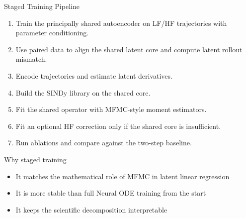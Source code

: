 \documentclass[aspectratio=169]{beamer}
\begin{document}
\begin{frame}{Staged Training Pipeline}
\begin{enumerate}
\item Train the principally shared autoencoder on LF/HF trajectories with parameter conditioning.
\item Use paired data to align the shared latent core and compute latent rollout mismatch.
\item Encode trajectories and estimate latent derivatives.
\item Build the SINDy library on the shared core.
\item Fit the shared operator with MFMC-style moment estimators.
\item Fit an optional HF correction only if the shared core is insufficient.
\item Run ablations and compare against the two-step baseline.
\end{enumerate}

\vspace{0.6em}
\begin{block}{Why staged training}
\begin{itemize}
\item It matches the mathematical role of MFMC in latent linear regression
\item It is more stable than full Neural ODE training from the start
\item It keeps the scientific decomposition interpretable
\end{itemize}
\end{block}
\end{frame}
\end{document}
